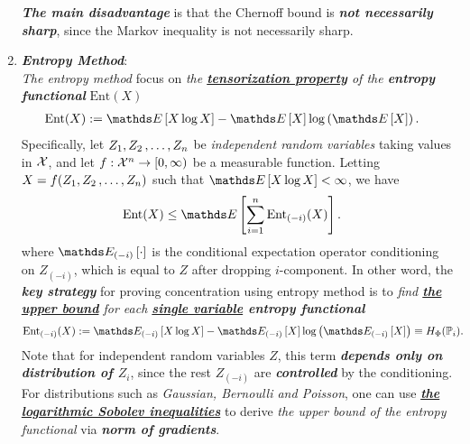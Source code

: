 \documentclass[11pt]{article}
\begin{document}
\begin{enumerate}
\begin{remark}
\emph{\textbf{The main disadvantage}} is that the Chernoff bound is \emph{\textbf{not necessarily sharp}}, since the Markov inequality is not necessarily sharp. 
\end{remark}

\item \emph{\textbf{Entropy Method}}:\\
\emph{The entropy method} focus on \emph{the \underline{\textbf{tensorization property}} of the \textbf{entropy functional}} $\text{Ent}(X)$
\begin{align*}
\text{Ent}(X)&:=  \E{}{X\log X} - \E{}{X}\log\paren{\E{}{X}}.
\end{align*}  Specifically,  let $Z_1, Z_2 \,{,}\ldots{,}\, Z_n$ be \emph{independent random variables} taking values in ${\mathcal X}$, and let $f: {\mathcal X}^n \to [0, \infty)$ be a measurable function. Letting $X = f(Z_1, Z_2 \,{,}\ldots{,}\, Z_n)$ such that $\E{}{X\log X} < \infty$, we have 
\begin{align*}
\text{Ent}(X)  &\le \E{}{\sum_{i=1}^{n} \text{Ent}_{(-i)}(X)}. 
\end{align*} where  $\E{(-i)}{\cdot}$ is the conditional expectation operator conditioning on $Z_{(-i)}$, which is equal to $Z$ after dropping $i$-component. In other word, the \emph{\textbf{key strategy}} for proving concentration using entropy method is to \emph{find \underline{\textbf{the upper bound}} for each \textbf{\underline{single variable} entropy functional}}
\begin{align*}
\text{Ent}_{(-i)}(X)&:=  \E{(-i)}{X\log X} - \E{(-i)}{X}\log\paren{\E{(-i)}{X}} \equiv H_{\Phi}(\bP_i).
\end{align*} Note that for independent random variables $Z$, this term \emph{\textbf{depends only on distribution of $Z_i$}}, since the rest $Z_{(-i)}$ are \emph{\textbf{controlled}} by the conditioning. For distributions such as \emph{Gaussian, Bernoulli and Poisson}, one can use \underline{\emph{\textbf{the logarithmic Sobolev inequalities}}} to derive \emph{the upper bound of the entropy functional} via \emph{\textbf{norm of gradients}}.


\end{enumerate}
\end{document}
